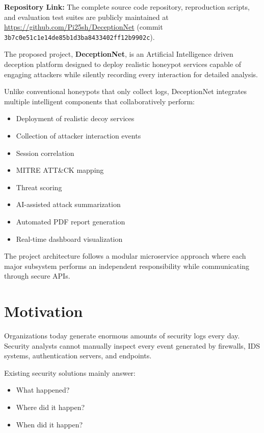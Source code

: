 \documentclass[12pt,a4paper]{report}
\begin{document}
\noindent \textbf{Repository Link:} The complete source code repository, reproduction scripts, and evaluation test suites are publicly maintained at \url{https://github.com/Pi25sh/DeceptionNet} (commit \texttt{3b7c0e51c1e14de85b1d3ba8433402ff12b9902c}).

The proposed project, \textbf{DeceptionNet}, is an Artificial Intelligence driven deception platform designed to deploy realistic honeypot services capable of engaging attackers while silently recording every interaction for detailed analysis.

Unlike conventional honeypots that only collect logs, DeceptionNet integrates multiple intelligent components that collaboratively perform:

\begin{itemize}
\item Deployment of realistic decoy services
\item Collection of attacker interaction events
\item Session correlation
\item MITRE ATT\&CK mapping
\item Threat scoring
\item AI-assisted attack summarization
\item Automated PDF report generation
\item Real-time dashboard visualization
\end{itemize}

The project architecture follows a modular microservice approach where each major subsystem performs an independent responsibility while communicating through secure APIs.


\section{Motivation}

Organizations today generate enormous amounts of security logs every day. Security analysts cannot manually inspect every event generated by firewalls, IDS systems, authentication servers, and endpoints.

Existing security solutions mainly answer:

\begin{itemize}
\item What happened?
\item Where did it happen?
\item When did it happen?
\end{itemize}
\end{document}
